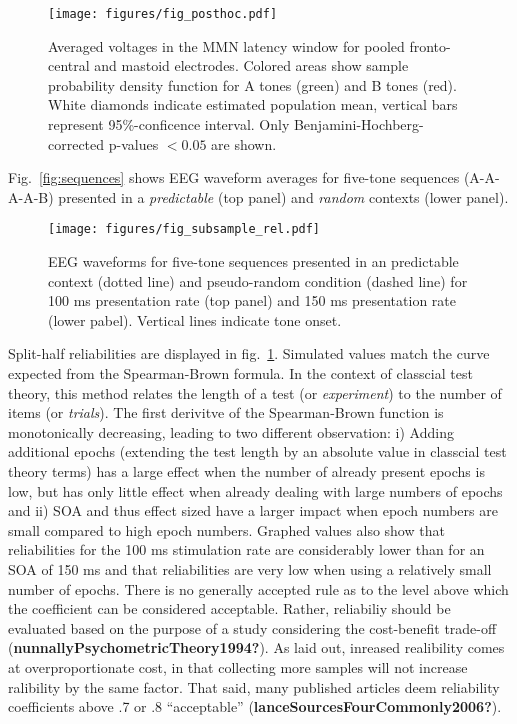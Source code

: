 \documentclass[stu,a4paper,12pt, nofontenc, babel, american]{apa7}
\begin{document}
\begin{figure}
\centering
\texttt{[image: figures/fig\_posthoc.pdf]}
\caption{Averaged voltages in the MMN latency window for pooled
fronto-central and mastoid electrodes. Colored areas show sample
probability density function for A tones (green) and B tones (red).
White diamonds indicate estimated population mean, vertical bars
represent 95\%-conficence interval. Only Benjamini-Hochberg-corrected
p-values \(< 0.05\) are shown.}
\end{figure}

Fig.~\ref{fig:sequences} shows EEG waveform averages for five-tone
sequences (A-A-A-A-B) presented in a \emph{predictable} (top panel) and
\emph{random} contexts (lower panel).

\begin{figure}
\hypertarget{fig:rel}{%
\centering
\texttt{[image: figures/fig\_subsample\_rel.pdf]}
\caption{EEG waveforms for five-tone sequences presented in an
predictable context (dotted line) and pseudo-random condition (dashed
line) for 100 ms presentation rate (top panel) and 150 ms presentation
rate (lower pabel). Vertical lines indicate tone onset.}\label{fig:rel}
}
\end{figure}

Split-half reliabilities are displayed in fig.~\ref{fig:rel}. Simulated
values match the curve expected from the Spearman-Brown formula. In the
context of classcial test theory, this method relates the length of a
test (or \emph{experiment}) to the number of items (or \emph{trials}).
The first derivitve of the Spearman-Brown function is monotonically
decreasing, leading to two different observation: i) Adding additional
epochs (extending the test length by an absolute value in classcial test
theory terms) has a large effect when the number of already present
epochs is low, but has only little effect when already dealing with
large numbers of epochs and ii) SOA and thus effect sized have a larger
impact when epoch numbers are small compared to high epoch numbers.
Graphed values also show that reliabilities for the 100 ms stimulation
rate are considerably lower than for an SOA of 150 ms and that
reliabilities are very low when using a relatively small number of
epochs. There is no generally accepted rule as to the level above which
the coefficient can be considered acceptable. Rather, reliabiliy should
be evaluated based on the purpose of a study considering the
cost-benefit trade-off (\textbf{nunnallyPsychometricTheory1994?}). As
laid out, inreased realibility comes at overproportionate cost, in that
collecting more samples will not increase ralibility by the same factor.
That said, many published articles deem reliability coefficients above
.7 or .8 \enquote{acceptable} (\textbf{lanceSourcesFourCommonly2006?}).
\end{document}
